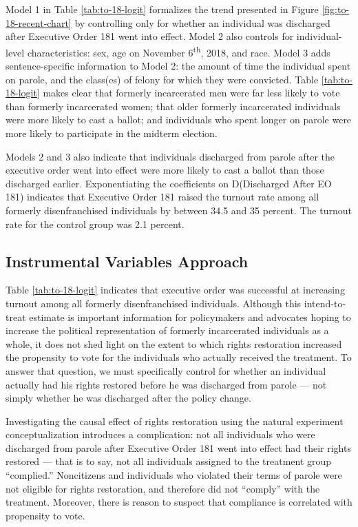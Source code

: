 \documentclass[
  12pt,
]{article}
\begin{document}


Model 1 in Table \ref{tab:to-18-logit} formalizes the trend presented in Figure \ref{fig:to-18-recent-chart} by controlling only for whether an individual was discharged after Executive Order 181 went into effect. Model 2 also controls for individual-level characteristics: sex, age on November 6\textsuperscript{th}, 2018, and race. Model 3 adds sentence-specific information to Model 2: the amount of time the individual spent on parole, and the class(es) of felony for which they were convicted. Table \ref{tab:to-18-logit} makes clear that formerly incarcerated men were far less likely to vote than formerly incarcerated women; that older formerly incarcerated individuals were more likely to cast a ballot; and individuals who spent longer on parole were more likely to participate in the midterm election.

Models 2 and 3 also indicate that individuals discharged from parole after the executive order went into effect were more likely to cast a ballot than those discharged earlier. Exponentiating the coefficients on D(Discharged After EO 181) indicates that Executive Order 181 raised the turnout rate among all formerly disenfranchised individuals by between 34.5 and 35 percent. The turnout rate for the control group was 2.1 percent.

\hypertarget{instrumental-variables-approach}{%
\subsection*{Instrumental Variables Approach}\label{instrumental-variables-approach}}

Table \ref{tab:to-18-logit} indicates that executive order was successful at increasing turnout among all formerly disenfranchised individuals. Although this intend-to-treat estimate is important information for policymakers and advocates hoping to increase the political representation of formerly incarcerated individuals as a whole, it does not shed light on the extent to which rights restoration increased the propensity to vote for the individuals who actually received the treatment. To answer that question, we must specifically control for whether an individual actually had his rights restored before he was discharged from parole --- not simply whether he was discharged after the policy change.

Investigating the causal effect of rights restoration using the natural experiment conceptualization introduces a complication: not all individuals who were discharged from parole after Executive Order 181 went into effect had their rights restored --- that is to say, not all individuals assigned to the treatment group ``complied.'' Noncitizens and individuals who violated their terms of parole were not eligible for rights restoration, and therefore did not ``comply'' with the treatment. Moreover, there is reason to suspect that compliance is correlated with propensity to vote.
\end{document}
